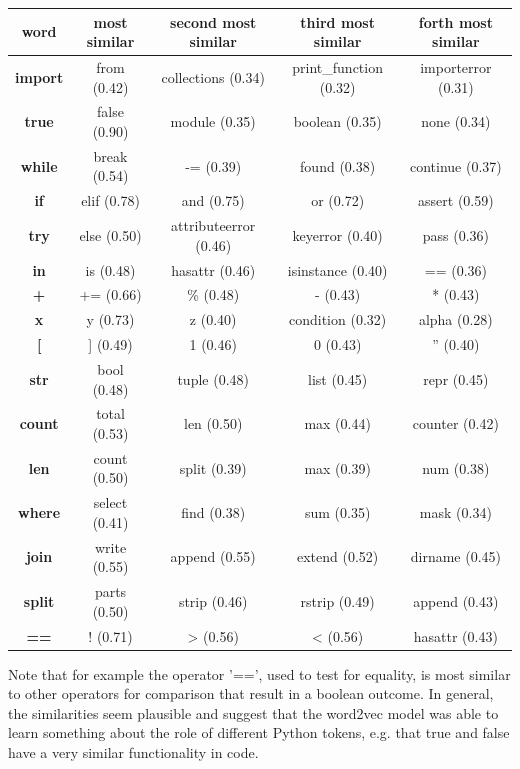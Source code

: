 \documentclass[
	a4paper,
	pagesize,
	pdftex,
	12pt,
	twoside, %
	BCOR=5mm, %
	ngerman,
	fleqn,
	final,
	]{scrartcl}
\begin{document}
\footnotesize
\begin{center}
	\begin{tabular}{ |c|c|c|c|c| } 
		\hline
		\textbf{word} & \textbf{ most similar} &\textbf{ second most similar} & \textbf{third most similar}& \textbf{forth most similar}\\ 
		\hline
		\textbf{import} & from (0.42) & collections (0.34) & print\_function (0.32) & importerror (0.31)\\ 
		\textbf{true} & false (0.90) & module (0.35) & boolean (0.35) & none (0.34)\\  
		\textbf{while} & break (0.54)  & -= (0.39) & found (0.38) & continue (0.37) \\
		\textbf{if} & elif (0.78)  & and (0.75) & or (0.72) & assert (0.59) \\
		\textbf{try} & else (0.50)  & attributeerror (0.46) & keyerror (0.40) & pass (0.36) \\
		\textbf{in} & is (0.48)  & hasattr (0.46) & isinstance (0.40) & == (0.36) \\
		\textbf{+} & += (0.66)  & \% (0.48) & - (0.43) & * (0.43) \\
		\textbf{x} & y (0.73)  & z (0.40) & condition (0.32) & alpha (0.28) \\
		\textbf{[} & ] (0.49)  & 1 (0.46) & 0 (0.43) & '' (0.40) \\
		\textbf{str} & bool (0.48)  & tuple (0.48) & list (0.45) & repr (0.45) \\
		\textbf{count} & total (0.53)  & len (0.50) & max (0.44) & counter (0.42) \\
		\textbf{len} & count (0.50)  & split (0.39) & max (0.39) & num (0.38) \\
		\textbf{where} & select (0.41)  & find (0.38) & sum (0.35) & mask (0.34) \\
		\textbf{join} & write (0.55)  & append (0.55) & extend (0.52) & dirname (0.45) \\
		\textbf{split} & parts (0.50)  & strip (0.46) & rstrip (0.49) & append (0.43) \\
		\textbf{==} & ! (0.71)  & > (0.56) & < (0.56) & hasattr (0.43) \\
		\hline
	\end{tabular}
\end{center}
\normalsize

Note that for example the operator '==', used to test for equality, is most similar to other operators for comparison that result in a boolean outcome. In general, the similarities seem plausible and suggest that the word2vec model was able to learn something about the role of different Python tokens, e.g. that true and false have a very similar functionality in code.\\ 
\end{document}
